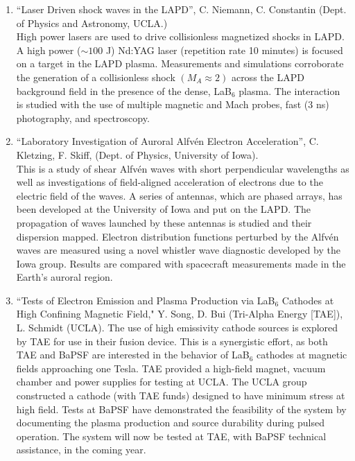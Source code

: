 \documentclass[11pt]{article}
\begin{document}
\begin{enumerate}

\item ``Laser Driven shock waves in the LAPD'', C. Niemann,
  C. Constantin (Dept. of Physics and Astronomy,
  UCLA.)\\ High power lasers are used to drive collisionless
  magnetized shocks in LAPD.  A high power ($\sim 100$ J) Nd:YAG laser (repetition rate 10
  minutes) is focused on a target in the LAPD plasma. Measurements and
  simulations corroborate the generation of a collisionless shock
  $(M_{A}\approx 2)$ across the LAPD background field in the presence
  of the dense, LaB$_{6}$ plasma. The interaction is studied with the
  use of multiple magnetic and Mach probes, fast (3 ns) photography, and
  spectroscopy.

\item ``Laboratory Investigation of Auroral Alfv\'{e}n Electron
  Acceleration'', C. Kletzing, F. Skiff, (Dept. of Physics, University
  of Iowa).\\ This is a study of shear Alfv\'{e}n waves with short
  perpendicular wavelengths as well as investigations of field-aligned
  acceleration of electrons due to the electric field of the waves. A
  series of antennas, which are phased arrays, has been developed at
  the University of Iowa and put on the LAPD. The propagation of waves
  launched by these antennas is studied and their dispersion
  mapped. Electron distribution functions perturbed by the Alfv\'{e}n
  waves are measured using a novel whistler wave diagnostic developed
  by the Iowa group. Results are compared with spacecraft
  measurements made in the Earth's auroral region.

%
\item ``Tests of Electron Emission and Plasma Production via LaB$_{6}$ Cathodes at High Confining Magnetic Field,"
Y. Song, D. Bui (Tri-Alpha Energy [TAE]), L. Schmidt (UCLA).  The use of high emissivity cathode sources is explored by TAE for use in their fusion device.  This is a synergistic effort, as both TAE and BaPSF are interested in the behavior of LaB$_{6}$ cathodes at magnetic fields approaching one Tesla. TAE provided a high-field magnet, vacuum chamber and power supplies for testing at UCLA.  The UCLA group constructed a cathode (with TAE funds) designed to have minimum stress at high field. Tests at BaPSF have demonstrated the feasibility of the system by documenting the plasma production and source durability during pulsed operation. The system will now be tested at TAE, with BaPSF technical assistance, in the coming year.



\end{enumerate}
\end{document}
